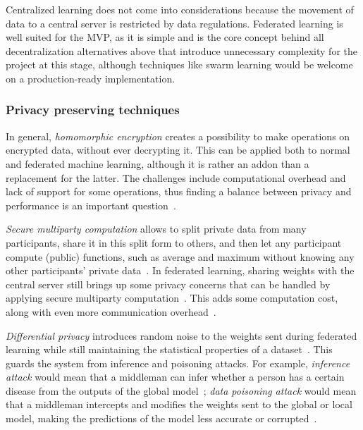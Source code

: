 Centralized learning does not come into considerations because the movement of data to a central server is restricted by data regulations. Federated learning is well suited for the MVP, as it is simple and is the core concept behind all decentralization alternatives above that introduce unnecessary complexity for the project at this stage, although techniques like swarm learning would be welcome on a production-ready implementation.


\subsubsection{Privacy preserving techniques} \label{subsubsec:privacy-perserving-techniques}

In general, \emph{homomorphic encryption} creates a possibility to make operations on encrypted data, without ever decrypting it. This can be applied both to normal and federated machine learning, although it is rather an addon than a replacement for the latter. The challenges include computational overhead and lack of support for some operations, thus finding a balance between privacy and performance is an important question~\cite{hallajiDecentralizedFederatedLearning2024, marquesTrainingMachineLearning2026}.

\emph{Secure multiparty computation} allows to split private data from many participants, share it in this split form to others, and then let any participant compute (public) functions, such as average and maximum without knowing any other participants' private data~\cite{evansPragmaticIntroductionSecure}. In federated learning, sharing weights with the central server still brings up some privacy concerns that can be handled by applying secure multiparty computation~\cite{mugunthanSMPAISecureMultiParty}. This adds some computation cost, along with even more communication overhead~\cite{hallajiDecentralizedFederatedLearning2024}.

\emph{Differential privacy} introduces random noise to the weights sent during federated learning while still maintaining the statistical properties of a dataset~\cite{dankarPracticingDifferentialPrivacy2013}. This guards the system from inference and poisoning attacks. For example, \emph{inference attack} would mean that a middleman can infer whether a person has a certain disease from the outputs of the global model~\cite{wuInferenceAttacksTaxonomy2024}; \emph{data poisoning attack} would mean that a middleman intercepts and modifies the weights sent to the global or local model, making the predictions of the model less accurate or corrupted~\cite{gabrielliSurveyDecentralizedFederated2023a}.

